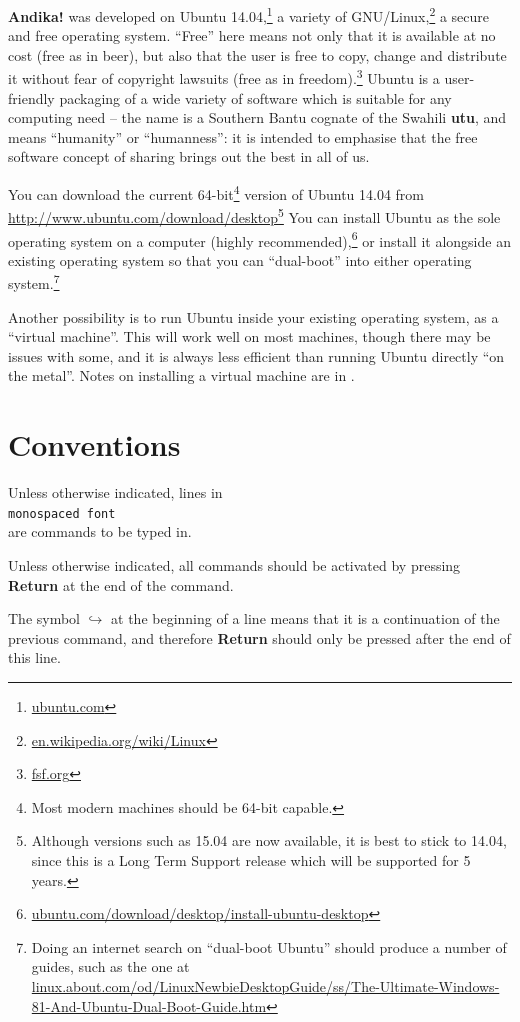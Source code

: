 \textbf{Andika!} was developed on Ubuntu 14.04,\footnote{\url{ubuntu.com}} a variety of GNU/Linux,\footnote{\url{en.wikipedia.org/wiki/Linux}} a secure and free operating system.  ``Free'' here means not only that it is available at no cost (free as in beer), but also that the user is free to copy, change and distribute it without fear of copyright lawsuits (free as in freedom).\footnote{\url{fsf.org}}  Ubuntu is a user-friendly packaging of a wide variety of software which is suitable for any computing need -- the name is a Southern Bantu cognate of the Swahili \textbf{utu}, and means ``humanity'' or ``humanness'': it is intended to emphasise that the free software concept of sharing brings out the best in all of us.

You can download the current 64-bit\footnote{Most modern machines should be 64-bit capable.} version of Ubuntu 14.04 from \url{http://www.ubuntu.com/download/desktop}\footnote{Although versions such as 15.04 are now available, it is best to stick to 14.04, since this is a Long Term Support release which will be supported for 5 years.}  You can install Ubuntu as the sole operating system on a computer (highly recommended),\footnote{\url{ubuntu.com/download/desktop/install-ubuntu-desktop}} or install it alongside an existing operating system so that you can ``dual-boot'' into either operating system.\footnote{Doing an internet search on ``dual-boot Ubuntu'' should produce a number of guides, such as the one at \url{linux.about.com/od/LinuxNewbieDesktopGuide/ss/The-Ultimate-Windows-81-And-Ubuntu-Dual-Boot-Guide.htm}}

Another possibility is to run Ubuntu inside your existing operating system, as a ``virtual machine''.  This will work well on most machines, though there may be issues with some, and it is always less efficient than running Ubuntu directly ``on the metal''.  Notes on installing a virtual machine are in .


\section{Conventions}

Unless otherwise indicated, lines in\\
\texttt{monospaced font}\\
are commands to be typed in.  

Unless otherwise indicated, all commands should be activated by pressing \textbf{Return} at the end of the command.

The symbol $\hookrightarrow$ at the beginning of a line means that it is a continuation of the previous command, and therefore \textbf{Return} should only be pressed after the end of this line.

